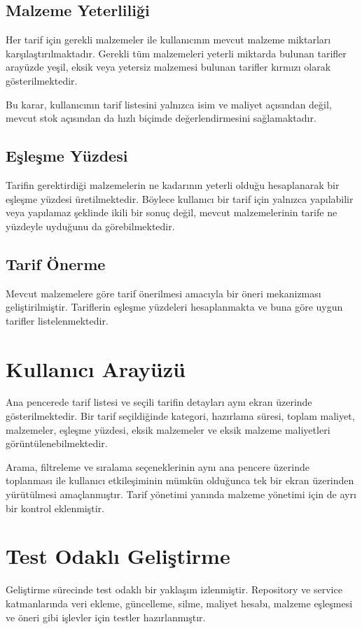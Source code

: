\documentclass[conference]{IEEEtran}
\begin{document}
\subsection{Malzeme Yeterliliği}
Her tarif için gerekli malzemeler ile kullanıcının mevcut malzeme miktarları karşılaştırılmaktadır. Gerekli tüm malzemeleri yeterli miktarda bulunan tarifler arayüzde yeşil, eksik veya yetersiz malzemesi bulunan tarifler kırmızı olarak gösterilmektedir.

Bu karar, kullanıcının tarif listesini yalnızca isim ve maliyet açısından değil, mevcut stok açısından da hızlı biçimde değerlendirmesini sağlamaktadır.

\subsection{Eşleşme Yüzdesi}
Tarifin gerektirdiği malzemelerin ne kadarının yeterli olduğu hesaplanarak bir eşleşme yüzdesi üretilmektedir. Böylece kullanıcı bir tarif için yalnızca yapılabilir veya yapılamaz şeklinde ikili bir sonuç değil, mevcut malzemelerinin tarife ne yüzdeyle uyduğunu da görebilmektedir.

\subsection{Tarif Önerme}
Mevcut malzemelere göre tarif önerilmesi amacıyla bir öneri mekanizması geliştirilmiştir. Tariflerin eşleşme yüzdeleri hesaplanmakta ve buna göre uygun tarifler listelenmektedir.

\section{Kullanıcı Arayüzü}
Ana pencerede tarif listesi ve seçili tarifin detayları aynı ekran üzerinde gösterilmektedir. Bir tarif seçildiğinde kategori, hazırlama süresi, toplam maliyet, malzemeler, eşleşme yüzdesi, eksik malzemeler ve eksik malzeme maliyetleri görüntülenebilmektedir.

Arama, filtreleme ve sıralama seçeneklerinin aynı ana pencere üzerinde toplanması ile kullanıcı etkileşiminin mümkün olduğunca tek bir ekran üzerinden yürütülmesi amaçlanmıştır. Tarif yönetimi yanında malzeme yönetimi için de ayrı bir kontrol eklenmiştir.

\section{Test Odaklı Geliştirme}
Geliştirme sürecinde test odaklı bir yaklaşım izlenmiştir. Repository ve service katmanlarında veri ekleme, güncelleme, silme, maliyet hesabı, malzeme eşleşmesi ve öneri gibi işlevler için testler hazırlanmıştır.
\end{document}
